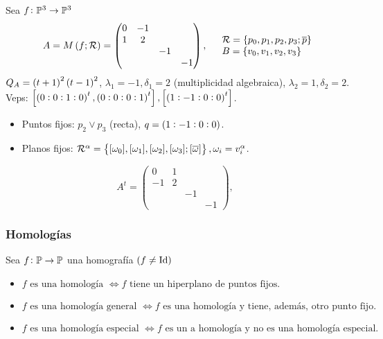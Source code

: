 \begin{example}
	Sea $f \colon \mathbb{P}^3 \to \mathbb{P}^3$ \\
	\[
		A = M\left( f; \mathcal{R}\right) = \begin{pmatrix}
		0 & -1 & & \\
		1 & 2 & & \\
		& & -1 & \\
		& & & -1
		\end{pmatrix}, \quad \begin{array}{l}
		\mathcal{R} = \{p_0, p_1, p_2, p_3; \overline{p}\} \\
		B = \{v_0, v_1, v_2, v_3\}
		\end{array}
	\]
	$Q_A = \left( t+1\right)^2\left( t-1\right)^2$, $\lambda_1 = -1, \delta_1 = 2 $ (multiplicidad algebraica), $\lambda_2 = 1, \delta_2 = 2$. Veps: $\left[ \left(0:0:1:0\right)^t, \left(0:0:0:1\right)^t \right], \left[ \left(1:-1:0:0\right)^t \right]$.
	\begin{itemize}
		\item Puntos fijos: $p_2 \vee p_3$ (recta), $q =\left( 1:-1:0:0\right)$.
		\item Planos fijos: $\mathcal{R}^\alpha = \left\{ [\omega_0], [\omega_1], [\omega_2], [\omega_3]; [\overline{\omega}]\right\}, \omega_i = v_i^\alpha$.
	\end{itemize}
	\[
		A^t = \begin{pmatrix}
			0 & 1 & & \\
			-1 & 2 & & \\
			& & -1 & \\
			& & & -1
		\end{pmatrix}, \quad
	\]
\end{example}


\subsubsection{Homologías}

\begin{defi}
    Sea $f \colon \mathbb{P} \to \mathbb{P}$ una homografía $\left( f \neq \operatorname{Id} \right)$
    \begin{itemize}
        \item $f \text{ es una homología } \iff f \text{ tiene un hiperplano de puntos fijos}.$
        \item $f \text{ es una homología general } \iff f \text{ es una homología y tiene, además, otro punto fijo}.$
        \item $f \text{ es una homología especial } \iff f \text{ es un a homología y no es una homología especial}.$
    \end{itemize}
\end{defi}

